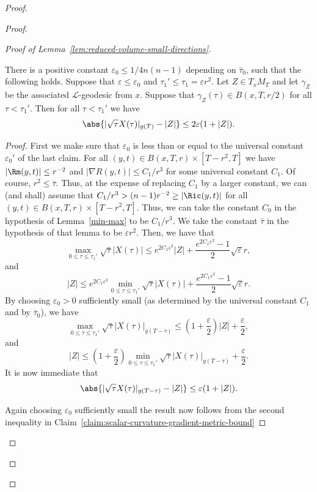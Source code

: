 \begin{proof}
\begin{proof}
\begin{proof}[Proof of Lemma~\ref{lem:reduced-volume-small-directions}]
\begin{claim}\label{claim:l-geodesic-norm-comparison}
There is  a
positive constant $\varepsilon_0\le 1/4n(n-1)$ depending on
$\bar\tau_0$, such that the following holds. Suppose that
 $\varepsilon\le \varepsilon_0$  and $\tau_1' \leq
\tau_1=\varepsilon r^2$. Let $Z\in T_xM_T$ and let $\gamma_Z$ be the
associated ${\mathcal L}$-geodesic from $x$. Suppose  that
$\gamma_Z(\tau) \in B(x,T,r/2)$ for all $\tau < \tau_1'$. Then for
all $\tau<\tau_1'$ we have
$$\abs{|\sqrt{\tau}X(\tau)|_{g(T)} - |Z|} \leq 2\varepsilon (1+|Z|).$$
\end{claim}

\begin{proof}
First we make sure that $\varepsilon_0$ is less than or equal to the
universal constant $\varepsilon_0'$ of the last claim. For all
$(y,t)\in B(x,T,r)\times [T-r^2,T]$ we have $|\Rm(y,t)|\le
r^{-2}$ and $|\nabla R(y,t)|\le C_1/r^3$ for some universal constant
$C_1$. Of course, $r^2\le \bar\tau$. Thus, at the expense of
replacing $C_1$ by a larger constant, we can (and shall) assume that
$C_1/r^3>(n-1)r^{-2}\ge |\Ric(y,t)|$ for all $(y,t)\in
B(x,T,r)\times [T-r^2,T]$. Thus, we can take the constant $C_0$ in
the hypothesis of Lemma~\ref{min-max} to be $C_1/r^3$. We take the
constant $\bar\tau$ in the hypothesis of that lemma to be
$\varepsilon r^2$. Then, we have that
$$\max_{0\le \tau\le \tau_1'}\sqrt{\tau}|X(\tau)|\le
e^{2C_1\varepsilon^2}|Z|+\frac{e^{2C_1\varepsilon^2}-1}{2}\sqrt{\varepsilon}
r,$$ and
$$|Z|\le e^{2C_1\varepsilon^2}\min_{0\le \tau\le
\tau_1'}\sqrt{\tau}|X(\tau)|+\frac{e^{2C_1\varepsilon^2}-1}{2}\sqrt{\varepsilon}r.$$
By choosing $\varepsilon_0>0$ sufficiently small (as determined by
the universal constant $C_1$ and by $\bar\tau_0$), we have
$$\max_{0\le \tau\le \tau_1'}\sqrt{\tau}|X(\tau)|_{g(T-\tau)}\le
(1+\frac{\varepsilon}{2})|Z|+\frac{\varepsilon}{2},$$ and
$$|Z|\le (1+\frac{\varepsilon}{2})\min_{0\le \tau\le
\tau_1'}\sqrt{\tau}|X(\tau)|_{g(T-\tau)}+\frac{\varepsilon}{2}.$$ It
is now immediate that
$$\abs{|\sqrt{\tau}X(\tau)|_{g(T-\tau)} - |Z|} \leq \varepsilon (1+|Z|).$$


Again choosing $\varepsilon_0$ sufficiently small the result now
follows from the second inequality in Claim~\ref{claim:scalar-curvature-gradient-metric-bound}
\end{proof}





\end{proof}
\end{proof}
\end{proof}
